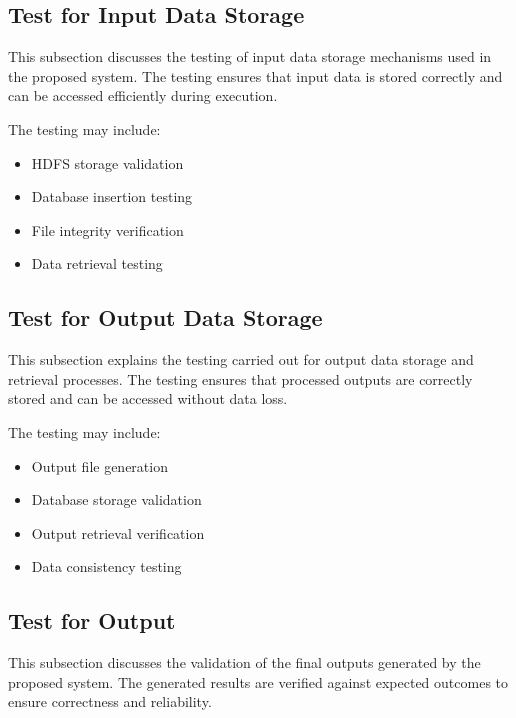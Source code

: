 
\subsection{Test for Input Data Storage}

This subsection discusses the testing of input data storage mechanisms used in the proposed system. The testing ensures that input data is stored correctly and can be accessed efficiently during execution.

The testing may include:
\begin{itemize}
    \item HDFS storage validation
    \item Database insertion testing
    \item File integrity verification
    \item Data retrieval testing
\end{itemize}


\subsection{Test for Output Data Storage}

This subsection explains the testing carried out for output data storage and retrieval processes. The testing ensures that processed outputs are correctly stored and can be accessed without data loss.

The testing may include:
\begin{itemize}
    \item Output file generation
    \item Database storage validation
    \item Output retrieval verification
    \item Data consistency testing
\end{itemize}


\subsection{Test for Output}

This subsection discusses the validation of the final outputs generated by the proposed system. The generated results are verified against expected outcomes to ensure correctness and reliability.

